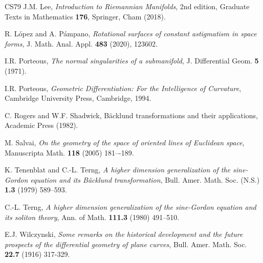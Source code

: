 \documentclass[12pt]{amsart}
\theoremstyle{plain}
\theoremstyle{definition}
\numberwithin{equation}{section}
\begin{document}
\begin{thebibliography}{CS79}
J.M. Lee, {\it Introduction to Riemannian Manifolds}, 2nd edition, Graduate Texts in Mathematics {\bf 176}, Springer, Cham (2018).

R. López and A. Pámpano, {\it Rotational surfaces of constant astigmatism in space forms}, 
J. Math. Anal. Appl. {\bf 483} (2020), 123602.


I.R. Porteous, \textit{The normal singularities of a submanifold}, J. Differential Geom. \textbf{5} (1971).

I.R. Porteous, \emph{Geometric Differentiation: For the Intelligence of Curvature}, Cambridge University Press, Cambridge, 1994.

C. Rogers and W.F. Shadwick, B\"acklund transformations and their applications, Academic Press (1982).




M. Salvai, \emph{On the geometry of the space of oriented lines of Euclidean space}, Manuscripta Math. \textbf{118} (2005) 181–-189. 


K. Tenenblat and C.-L. Terng, {\it A higher dimension generalization of the sine-Gordon equation and its B\"acklund transformation}, Bull. Amer. Math. Soc. (N.S.) \textbf{1.3} (1979) 589--593.

C.-L. Terng, {\it A higher dimension generalization of the sine-Gordon equation and its soliton theory}, Ann. of Math.  \textbf{111.3} (1980) 491--510.





E.J. Wilczynski, {\it Some remarks on the historical development and the future prospects of the differential geometry of plane curves}, Bull. Amer. Math. Soc. \textbf{22.7} (1916) 317-329.

\end{thebibliography}
\end{document}
